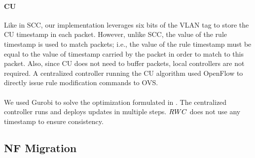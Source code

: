 \paragraph{CU}

Like in SCC, our implementation leverages six bits of the VLAN tag to
store the CU timestamp in each packet. However, unlike SCC, the value
of the rule timestamp is used to match packets; i.e., the value of the
rule timestamp must be equal to the value of timestamp carried by the
packet in order to match to this packet. Also, since CU does not need
to buffer packets, local controllers are not required. A centralized
controller running the CU algorithm used OpenFlow to directly issue
rule modification commands to OVS.

\paragraph{\ourRouteUpdateName}
We used Gurobi to solve the optimization formulated in
. The centralized controller runs
\ourRouteUpdateName and deploys updates in multiple steps.
$RWC$ does not use any timestamp to ensure
consistency.

\subsection{NF Migration}


